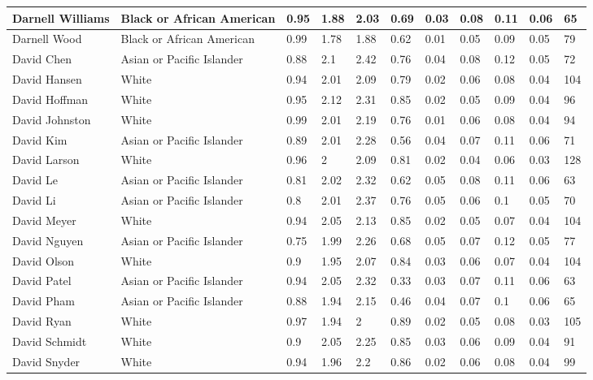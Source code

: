 \begin{table}[!ht]
\begin{tabular}{|l|l|l|l|l|l|l|l|l|l|l|}
        Darnell Williams & Black or African American & 0.95 & 1.88 & 2.03 & 0.69 & 0.03 & 0.08 & 0.11 & 0.06 & 65 \\ \hline
        Darnell Wood & Black or African American & 0.99 & 1.78 & 1.88 & 0.62 & 0.01 & 0.05 & 0.09 & 0.05 & 79 \\ \hline
        David Chen & Asian or Pacific Islander & 0.88 & 2.1 & 2.42 & 0.76 & 0.04 & 0.08 & 0.12 & 0.05 & 72 \\ \hline
        David Hansen & White & 0.94 & 2.01 & 2.09 & 0.79 & 0.02 & 0.06 & 0.08 & 0.04 & 104 \\ \hline
        David Hoffman & White & 0.95 & 2.12 & 2.31 & 0.85 & 0.02 & 0.05 & 0.09 & 0.04 & 96 \\ \hline
        David Johnston & White & 0.99 & 2.01 & 2.19 & 0.76 & 0.01 & 0.06 & 0.08 & 0.04 & 94 \\ \hline
        David Kim & Asian or Pacific Islander & 0.89 & 2.01 & 2.28 & 0.56 & 0.04 & 0.07 & 0.11 & 0.06 & 71 \\ \hline
        David Larson & White & 0.96 & 2 & 2.09 & 0.81 & 0.02 & 0.04 & 0.06 & 0.03 & 128 \\ \hline
        David Le & Asian or Pacific Islander & 0.81 & 2.02 & 2.32 & 0.62 & 0.05 & 0.08 & 0.11 & 0.06 & 63 \\ \hline
        David Li & Asian or Pacific Islander & 0.8 & 2.01 & 2.37 & 0.76 & 0.05 & 0.06 & 0.1 & 0.05 & 70 \\ \hline
        David Meyer & White & 0.94 & 2.05 & 2.13 & 0.85 & 0.02 & 0.05 & 0.07 & 0.04 & 104 \\ \hline
        David Nguyen & Asian or Pacific Islander & 0.75 & 1.99 & 2.26 & 0.68 & 0.05 & 0.07 & 0.12 & 0.05 & 77 \\ \hline
        David Olson & White & 0.9 & 1.95 & 2.07 & 0.84 & 0.03 & 0.06 & 0.07 & 0.04 & 104 \\ \hline
        David Patel & Asian or Pacific Islander & 0.94 & 2.05 & 2.32 & 0.33 & 0.03 & 0.07 & 0.11 & 0.06 & 63 \\ \hline
        David Pham & Asian or Pacific Islander & 0.88 & 1.94 & 2.15 & 0.46 & 0.04 & 0.07 & 0.1 & 0.06 & 65 \\ \hline
        David Ryan & White & 0.97 & 1.94 & 2 & 0.89 & 0.02 & 0.05 & 0.08 & 0.03 & 105 \\ \hline
        David Schmidt & White & 0.9 & 2.05 & 2.25 & 0.85 & 0.03 & 0.06 & 0.09 & 0.04 & 91 \\ \hline
        David Snyder & White & 0.94 & 1.96 & 2.2 & 0.86 & 0.02 & 0.06 & 0.08 & 0.04 & 99 \\ \hline

\end{tabular}
\end{table}

